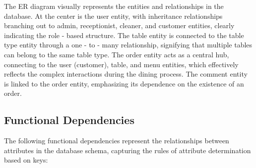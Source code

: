 \documentclass[12pt]{article}
\begin{document}
The ER diagram visually represents the entities and relationships in the database. At the center is the user entity, with inheritance relationships branching out to admin, receptionist, cleaner, and customer entities, clearly indicating the role - based structure. The table entity is connected to the table type entity through a one - to - many relationship, signifying that multiple tables can belong to the same table type. The order entity acts as a central hub, connecting to the user (customer), table, and menu entities, which effectively reflects the complex interactions during the dining process. The comment entity is linked to the order entity, emphasizing its dependence on the existence of an order.



\subsection{Functional Dependencies}
The following functional dependencies represent the relationships between attributes in the database schema, capturing the rules of attribute determination based on keys:
\end{document}

